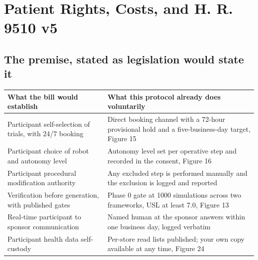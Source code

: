 \section{Patient Rights, Costs, and H. R. 9510 v5}

\subsection{The premise, stated as legislation would state it}


\vspace{0.30em}

\noindent\begin{tabularx}{\textwidth}{L{4.3cm} Y}
\toprule
\textbf{What the bill would establish} & \textbf{What this protocol already does voluntarily} \\
\midrule
Participant self-selection of trials, with 24/7 booking & Direct booking channel with a 72-hour provisional hold and a five-business-day target, Figure 15 \\
Participant choice of robot and autonomy level & Autonomy level set per operative step and recorded in the consent, Figure 16 \\
Participant procedural modification authority & Any excluded step is performed manually and the exclusion is logged and reported \\
Verification before generation, with published gates & Phase 0 gate at 1000 simulations across two frameworks, USL at least 7.0, Figure 13 \\
Real-time participant to sponsor communication & Named human at the sponsor answers within one business day, logged verbatim \\
Participant health data self-custody & Per-store read lists published; your own copy available at any time, Figure 24 \\
\bottomrule
\end{tabularx}

